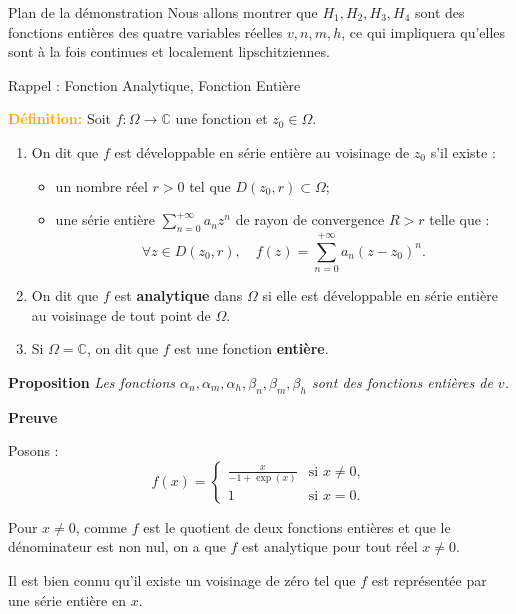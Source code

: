 \documentclass[10pt,french]{beamer}
\begin{document}
	\begin{frame}{Plan de la démonstration}
		Nous allons montrer que $H_1, H_2, H_3, H_4$ sont des fonctions entières des quatre variables réelles $v, n, m, h$, ce qui impliquera qu'elles sont à la fois continues et localement lipschitziennes.
	\end{frame}
	\begin{frame}{Rappel : Fonction Analytique, Fonction Entière}
		\begin{boxO}
			\textbf{\textcolor{orange}{Définition:}} Soit $f : \Omega \to \mathbb{C}$ une fonction et $z_0 \in \Omega$.
			\begin{enumerate}
				\item On dit que $f$ est développable en série entière au voisinage de $z_0$ s'il existe :
				\begin{itemize}
					\item un nombre réel $r > 0$ tel que $D(z_0, r) \subset \Omega$;
					\item une série entière $\sum_{n=0}^{+\infty} a_n z^n$ de rayon de convergence $R > r$ telle que :
					\[
					\forall z \in D(z_0, r), \quad f(z) = \sum_{n=0}^{+\infty} a_n (z - z_0)^n.
					\]
				\end{itemize}
				\item On dit que $f$ est \textbf{analytique} dans $\Omega$ si elle est développable en série entière au voisinage de tout point de $\Omega$.
				\item Si $\Omega=\mathbb{C}$, on dit que $f$ est une fonction \textbf{entière}.
			\end{enumerate}
		\end{boxO}
	\end{frame}
	\begin{frame}
		\begin{boxG}
			\textbf{\textcolor{green!60!black}{Proposition}}
			\textit{Les fonctions $\alpha_n, \alpha_m, \alpha_h, \beta_n, \beta_m, \beta_h$ sont des fonctions entières de $v$.}    
		\end{boxG}
		
		\textbf{Preuve}
		
		Posons :
		\[
		f(x) = 
		\begin{cases}
			\frac{x}{-1 + \exp(x)} & \text{si } x \neq 0, \\
			1 & \text{si } x = 0.
		\end{cases}
		\]
		
		Pour $x \neq 0$, comme $f$ est le quotient de deux fonctions entières et que le dénominateur est non nul, on a que $f$ est analytique pour tout réel $x \neq 0$.
		
		Il est bien connu qu’il existe un voisinage de zéro tel que $f$ est représentée par une série entière en $x$. 
	\end{frame}
	
\end{document}
